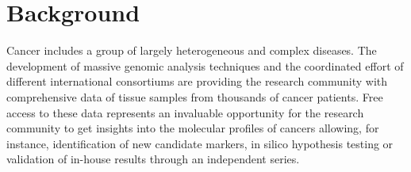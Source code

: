 \documentclass{bmcart}
\begin{document}
\begin{frontmatter}
\begin{abstractbox}

\end{abstractbox}
%

\end{frontmatter}




\section*{Background}



Cancer includes a group of largely heterogeneous and complex diseases. The development of massive genomic analysis techniques and the coordinated effort of different international consortiums are providing the research community with comprehensive data of tissue samples from thousands of cancer patients. Free access to these data represents an invaluable opportunity for the research community to get insights into the molecular profiles of cancers allowing, for instance, identification of new candidate markers, in silico hypothesis testing or validation of in-house results through an independent series.\\
\end{document}
